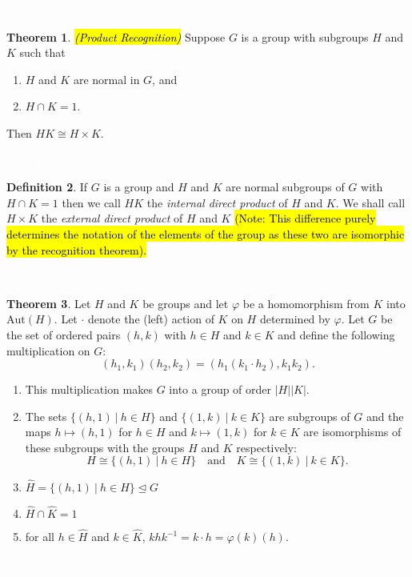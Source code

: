 \documentclass{article}
\theoremstyle{definition}
\newtheorem{thm}{Theorem}[section]
\newtheorem{defn}[thm]{Definition}
\newcommand{\nl}{\textcolor{white}{nothing}}
\newcommand{\wh}{\widehat}
\newcommand{\inv}{^{-1}}
\newcommand{\vphi}{\varphi}
\newcommand{\Aut}{\text{Aut}}
\begin{document}
\nl

\begin{thm}\hl{\textit{(Product Recognition)}} Suppose $G$ is a group with subgroups $H$ and $K$ such that
\begin{enumerate}
\item $H$ and $K$ are normal in $G$, and
\item $H\cap K = 1$.
\end{enumerate}
Then $HK\cong H\times K$.
\end{thm}

\nl

\begin{defn}
If $G$ is a group and $H$ and $K$ are normal subgroups of $G$ with $H\cap K = 1$ then we call $HK$ the \textit{internal direct product} of $H$ and $K$. We shall call $H\times K$ the \textit{external direct product} of $H$ and $K$ \hl{(Note: This difference purely determines the notation of the elements of the group as these two are isomorphic by the recognition theorem).}
\end{defn}

\nl

\begin{thm}\label{con. semi}
Let $H$ and $K$ be groups and let $\vphi$ be a homomorphism from $K$ into $\Aut(H)$. Let $\cdot$ denote the (left) action of $K$ on $H$ determined by $\vphi$. Let $G$ be the set of ordered pairs $(h,k)$ with $h\in H$ and $k\in K$ and define the following multiplication on $G$:
\[(h_1,k_1)(h_2,k_2) = (h_1(k_1\cdot h_2), k_1k_2).\]
\begin{enumerate}
\item This multiplication makes $G$ into a group of order $|H||K|$.
\item The sets $\{(h, 1)\ |\ h\in H\}$ and $\{(1,k)\ |\ k\in K\}$ are subgroups of $G$ and the maps $h\mapsto (h,1)$ for $h\in H$ and $k\mapsto (1,k)$ for $k\in K$ are isomorphisms of these subgroups with the groups $H$ and $K$ respectively:
\[H\cong \{(h, 1)\ |\ h\in H\}\quad\text{and}\quad K\cong\{(1,k)\ |\ k\in K\}.\]
\item $\wh H = \{(h, 1)\ |\ h\in H\}\unlhd G$
\item $\wh H\cap \wh K = 1$
\item for all $h\in \wh H$ and $k\in\wh K$, $khk\inv = k\cdot h = \vphi(k)(h)$.

\end{enumerate}
\end{thm}


\nl
\end{document}
